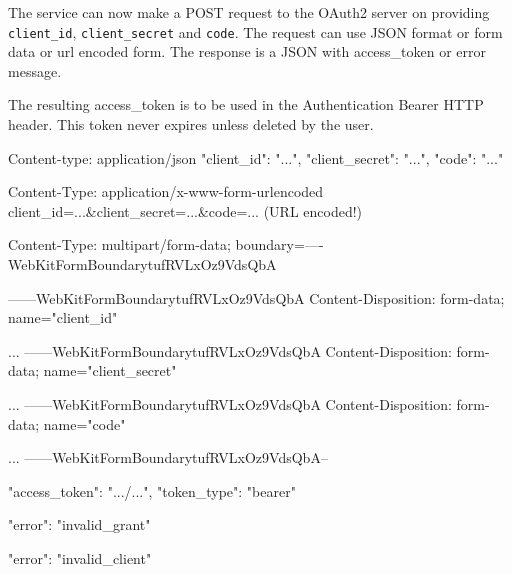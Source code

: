 The service can now make a POST request to the \zwaveme OAuth2 server on  providing \texttt{client\_id}, \texttt{client\_secret} and \texttt{code}.
The request can use JSON format or form data or url encoded form. The response is a JSON with access\_token or error message.

The resulting access\_token is to be used in the Authentication Bearer HTTP header.
This token never expires unless deleted by the user.

\begin{listingverbatim}
Content-type: application/json
{
    "client_id": "...",
    "client_secret": "...",
    "code": "..."
}
\end{listingverbatim}

\begin{listingverbatim}
Content-Type: application/x-www-form-urlencoded
client_id=...&client_secret=...&code=... (URL encoded!)
\end{listingverbatim}

\begin{listingverbatim}
Content-Type: multipart/form-data; boundary=----WebKitFormBoundarytufRVLxOz9VdsQbA

------WebKitFormBoundarytufRVLxOz9VdsQbA
Content-Disposition: form-data; name="client_id"

...
------WebKitFormBoundarytufRVLxOz9VdsQbA
Content-Disposition: form-data; name="client_secret"

...
------WebKitFormBoundarytufRVLxOz9VdsQbA
Content-Disposition: form-data; name="code"

...
------WebKitFormBoundarytufRVLxOz9VdsQbA--
\end{listingverbatim}

\begin{listingverbatim}
{
    "access_token": ".../...",
    "token_type": "bearer"
}
\end{listingverbatim}

\begin{listingverbatim}
{
    "error": "invalid_grant"
}
\end{listingverbatim}

\begin{listingverbatim}
{
    "error": "invalid_client"
}
\end{listingverbatim}


